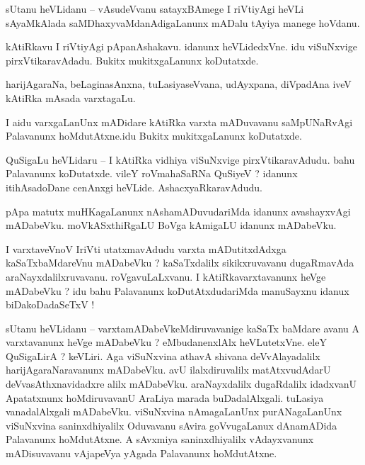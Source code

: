\documentclass{article}
\begin{document}

\begin{mn}%
sUtanu heVLidanu -- vAsudeVvanu satayxBAmege I riVtiyAgi heVLi sAyaMkAlada 
saMDhaxyvaMdanAdigaLanunx mADalu tAyiya manege hoVdanu.
\end{mn}

\begin{mn}%
kAtiRkavu I riVtiyAgi pApanAshakavu. idanunx heVLidedxVne. idu viSuNxvige pirxVtikaravAdadu. 
Bukitx mukitxgaLanunx koDutatxde.
\end{mn}

\begin{mn}%
harijAgaraNa, beLaginasAnxna, tuLasiyaseVvana, udAyxpana, diVpadAna iveV kAtiRka mAsada varxtagaLu.
\end{mn}

\begin{mn}%
I aidu varxgaLanUnx mADidare kAtiRka varxta mADuvavanu saMpUNaRvAgi Palavanunx hoMdutAtxne.idu 
Bukitx mukitxgaLanunx koDutatxde.
\end{mn}

\begin{mn}%
QuSigaLu heVLidaru -- I kAtiRka vidhiya viSuNxvige pirxVtikaravAdudu. bahu Palavanunx koDutatxde. 
vileY roVmahaSaRNa QuSiyeV ? idanunx itihAsadoDane cenAnxgi heVLide. AshacxyaRkaravAdudu.
\end{mn}

\begin{mn}%
pApa matutx muHKagaLanunx nAshamADuvudariMda idanunx avashayxvAgi mADabeVku. moVkASxthiRgaLU BoVga 
kAmigaLU idanunx mADabeVku.
\end{mn}

\begin{mn}%
I varxtaveVnoV IriVti utatxmavAdudu varxta mADutitxdAdxga kaSaTxbaMdareVnu mADabeVku ? 
kaSaTxdalilx sikikxruvavanu dugaRmavAda araNayxdalilxruvavanu. roVgavuLaLxvanu. I 
kAtiRkavarxtavanunx heVge mADabeVku ? idu bahu Palavanunx koDutAtxdudariMda manuSayxnu idanux 
biDakoDadaSeTxV !
\end{mn}

\begin{mn}%
sUtanu heVLidanu -- varxtamADabeVkeMdiruvavanige kaSaTx baMdare avanu A varxtavanunx heVge 
mADabeVku ? eMbudanenxlAlx heVLutetxVne. eleY QuSigaLirA ? keVLiri. Aga viSuNxvina athavA shivana 
deVvAlayadalilx harijAgaraNaravanunx mADabeVku. avU ilalxdiruvalilx matAtxvudAdarU 
deVvasAthxnavidadxre alilx mADabeVku. araNayxdalilx dugaRdalilx idadxvanU Apatatxnunx 
hoMdiruvavanU AraLiya marada buDadalAlxgali. tuLasiya vanadalAlxgali mADabeVku. viSuNxvina 
nAmagaLanUnx purANagaLanUnx viSuNxvina saninxdhiyalilx Oduvavanu sAvira goVvugaLanux dAnamADida 
Palavanunx hoMdutAtxne. A sAvxmiya saninxdhiyalilx vAdayxvanunx mADisuvavanu vAjapeVya yAgada 
Palavanunx hoMdutAtxne.
\end{mn}
\end{document}
